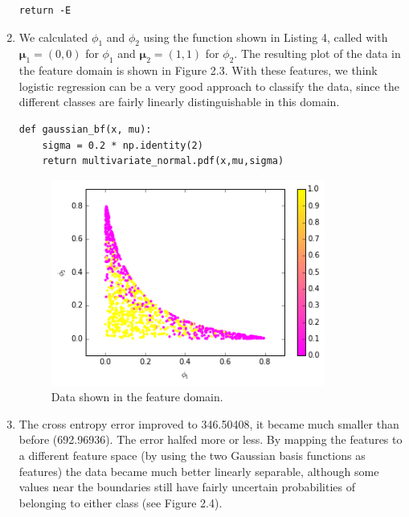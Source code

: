 \documentclass[a4paper,10pt]{article}
\numberwithin{equation}{section} %
\numberwithin{figure}{section} %
\numberwithin{table}{section} %
\theoremstyle{mytheor}
\begin{document}
\begin{enumerate}
\begin{lstlisting}[label={list:first},caption=Python code for function \textit{cross\_entropy\_error(labels, y)}.]
    return -E
    		\end{lstlisting}
	\item We calculated $\phi_1$ and $\phi_2$ using the function shown in Listing 4, called with $\boldsymbol{\mu}_1 = (0,0)$ for $\phi_1$ and $\boldsymbol{\mu}_2 = (1,1)$ for $\phi_2$. The resulting plot of the data in the feature domain is shown in Figure 2.3. With these features, we think logistic regression can be a very good approach to classify the data, since the different classes are fairly linearly distinguishable in this domain.
		\begin{lstlisting}[label={list:first},caption=Python code for function \textit{gaussian\_bf(x, mu)}.]
def gaussian_bf(x, mu):
    sigma = 0.2 * np.identity(2)
    return multivariate_normal.pdf(x,mu,sigma)
		\end{lstlisting}
		\begin{figure}[h!]
   			\centering
   			\includegraphics[width=0.85\textwidth]{exercise2curvy.png}\vspace{-0.4cm}
   			\caption{\vspace{-0.0cm} Data shown in the feature domain.}
  		\end{figure}
	\item The cross entropy error improved to 346.50408, it became much smaller than before (692.96936). The error halfed more or less. By mapping the features to a different feature space (by using the two Gaussian basis functions as features) the data became much better linearly separable, although some values near the boundaries still have fairly uncertain probabilities of belonging to either class (see Figure 2.4).
		\begin{figure}[h!]
   			\centering

\end{figure}
\end{enumerate}
\end{document}
